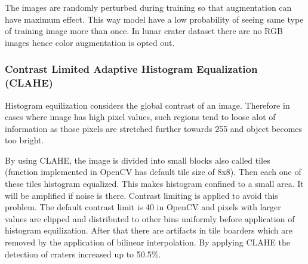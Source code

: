 \documentclass[11pt]{article}
\begin{document}
The images are randomly perturbed during training so that augmentation can have maximum effect. This way model have a low probability of seeing same type of training image more than once. In lunar crater dataset there are no RGB images hence color augmentation is opted out.

\subsubsection{Contrast Limited Adaptive Histogram Equalization (CLAHE)}
Histogram equilization considers the global contrast of an image. Therefore in cases where image has high pixel values, such regions tend to loose alot of information as those pixels are stretched further towards 255 and object becomes too bright. 

By using CLAHE, the image is divided into small blocks also called tiles (function implemented in OpenCV has default tile size of 8x8). Then each one of these tiles histogram equalized. This makes histogram confined to a small area. It will be amplified if noise is there. Contrast limiting is applied to avoid this problem. The default contrast limit is 40 in OpenCV and pixels with larger values are clipped and distributed to other bins uniformly before application of histogram equilization. After that there are artifacts in tile boarders which are removed by the application of bilinear interpolation.
By applying CLAHE the detection of craters increased up to 50.5\%. 
\end{document}
